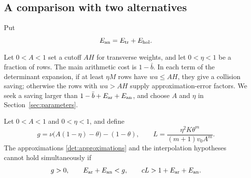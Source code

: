 \subsection{A comparison with two alternatives}

Put
\begin{equation}
 E_{\rm an}=E_{\rm tr}+E_{\rm hol}.
 \label{det:analytic-error}
\end{equation}

Let $0<A<1$ set a cutoff $AH$ for transverse weights, and let
$0<\eta<1$ be a fraction of rows. The main arithmetic cost is
$1-\bar b$. In each term of the determinant expansion, if at least
$\eta M$ rows have $wa\le AH$, they give a collision saving;
otherwise the rows with $wa>AH$ supply approximation-error factors.
We seek a saving larger than $1-\bar b+E_{\rm ar}+E_{\rm an}$, and
choose $A$ and $\eta$ in Section~\ref{sec:parameters}.

\begin{proposition}\label{det:comparison}
Let $0<A<1$ and $0<\eta<1$, and define
\begin{equation}
 g=\nu\bigl(A(1-\eta)-\theta\bigr)-(1-\theta),
 \qquad
 L=\frac{\eta^2K\theta^m}{(m+1)v_0A^m}.
 \label{det:budgets}
\end{equation}
The approximations \eqref{det:approximations} and the interpolation
hypotheses cannot hold simultaneously if
\begin{equation}
 g>0,\qquad
 E_{\rm ar}+E_{\rm an}<g,
 \qquad
 cL>1+E_{\rm ar}+E_{\rm an}.
 \label{det:contradiction-conditions}
\end{equation}
\end{proposition}

